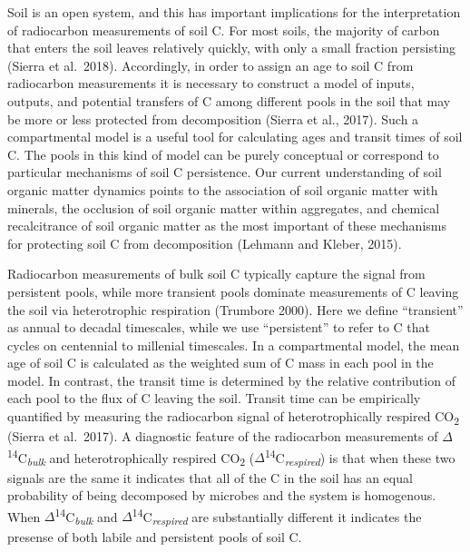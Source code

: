 \documentclass[english,man,floatsintext]{apa6}
\begin{document}
Soil is an open system, and this has important implications for the interpretation of radiocarbon measurements of soil C. For most soils, the majority of carbon that enters the soil leaves relatively quickly, with only a small fraction persisting (Sierra et al.~2018). Accordingly, in order to assign an age to soil C from radiocarbon measurements it is necessary to construct a model of inputs, outputs, and potential transfers of C among different pools in the soil that may be more or less protected from decomposition (Sierra et al., 2017). Such a compartmental model is a useful tool for calculating ages and transit times of soil C. The pools in this kind of model can be purely conceptual or correspond to particular mechanisms of soil C persistence. Our current understanding of soil organic matter dynamics points to the association of soil organic matter with minerals, the occlusion of soil organic matter within aggregates, and chemical recalcitrance of soil organic matter as the most important of these mechanisms for protecting soil C from decomposition (Lehmann and Kleber, 2015).

Radiocarbon measurements of bulk soil C typically capture the signal from persistent pools, while more transient pools dominate measurements of C leaving the soil via heterotrophic respiration (Trumbore 2000). Here we define \enquote{transient} as annual to decadal timescales, while we use \enquote{persistent} to refer to C that cycles on centennial to millenial timescales. In a compartmental model, the mean age of soil C is calculated as the weighted sum of C mass in each pool in the model. In contrast, the transit time is determined by the relative contribution of each pool to the flux of C leaving the soil. Transit time can be empirically quantified by measuring the radiocarbon signal of heterotrophically respired CO\textsubscript{2} (Sierra et al.~2017). A diagnostic feature of the radiocarbon measurements of \(\Delta\)\textsuperscript{14}C\textsubscript{\emph{bulk}} and heterotrophically respired CO\textsubscript{2} (\(\Delta\)\textsuperscript{14}C\textsubscript{\emph{respired}}) is that when these two signals are the same it indicates that all of the C in the soil has an equal probability of being decomposed by microbes and the system is homogenous. When \(\Delta\)\textsuperscript{14}C\textsubscript{\emph{bulk}} and \(\Delta\)\textsuperscript{14}C\textsubscript{\emph{respired}} are substantially different it indicates the presense of both labile and persistent pools of soil C.
\end{document}
